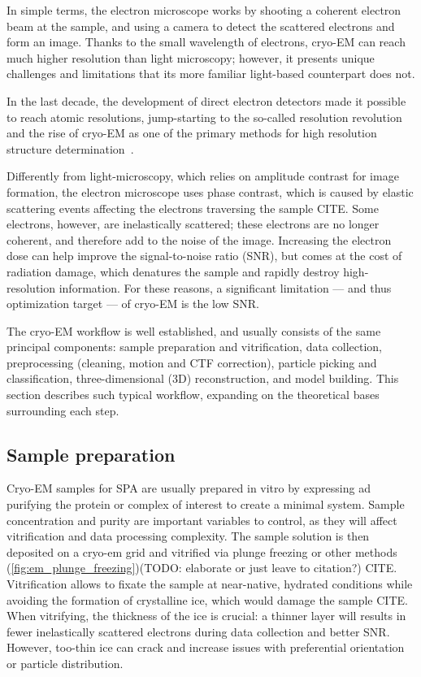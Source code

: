In simple terms, the electron microscope works by shooting a coherent electron beam at the sample, and using a camera to detect the scattered electrons and form an image.
Thanks to the small wavelength of electrons, cryo-EM can reach much higher resolution than light microscopy; however, it presents unique challenges and limitations that its more familiar light-based counterpart does not.

In the last decade, the development of direct electron detectors made it possible to reach atomic resolutions, jump-starting to the so-called resolution revolution and the rise of cryo-EM as one of the primary methods for high resolution structure determination~\cite{faruqiCCDDetectorsHighresolution2000}.

Differently from light-microscopy, which relies on amplitude contrast for image formation, the electron microscope uses phase contrast, which is caused by elastic scattering events affecting the electrons traversing the sample CITE.
Some electrons, however, are inelastically scattered; these electrons are no longer coherent, and therefore add to the noise of the image.
Increasing the electron dose can help improve the signal-to-noise ratio (SNR), but comes at the cost of radiation damage, which denatures the sample and rapidly destroy high-resolution information.
For these reasons, a significant limitation --- and thus optimization target --- of cryo-EM is the low SNR.

The cryo-EM workflow is well established, and usually consists of the same principal components: sample preparation and vitrification, data collection, preprocessing (cleaning, motion and CTF correction), particle picking and classification, three-dimensional (3D) reconstruction, and model building.
This section describes such typical workflow, expanding on the theoretical bases surrounding each step.

\subsection{Sample preparation}
Cryo-EM samples for SPA are usually prepared in vitro by expressing ad purifying the protein or complex of interest to create a minimal system.
Sample concentration and purity are important variables to control, as they will affect vitrification and data processing complexity.
The sample solution is then deposited on a cryo-em grid and vitrified via plunge freezing or other methods (\autoref{fig:em_plunge_freezing})(TODO: elaborate or just leave to citation?) CITE.
Vitrification allows to fixate the sample at near-native, hydrated conditions while avoiding the formation of crystalline ice, which would damage the sample CITE.
When vitrifying, the thickness of the ice is crucial: a thinner layer will results in fewer inelastically scattered electrons during data collection and better SNR.
However, too-thin ice can crack and increase issues with preferential orientation or particle distribution.

